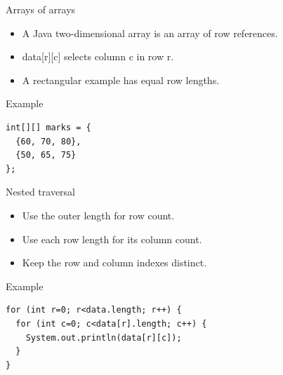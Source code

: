 \documentclass[10pt,aspectratio=169]{beamer}
\begin{document}
\begin{frame}[fragile,t]{Arrays of arrays}
\begin{itemize}
\item A Java two-dimensional array is an array of row references.
\item data[r][c] selects column c in row r.
\item A rectangular example has equal row lengths.
\end{itemize}
\vspace{1mm}\begin{block}{Example}
\begin{lstlisting}
int[][] marks = {
  {60, 70, 80},
  {50, 65, 75}
};
\end{lstlisting}
\end{block}
\end{frame}

\begin{frame}[fragile,t]{Nested traversal}
\begin{itemize}
\item Use the outer length for row count.
\item Use each row length for its column count.
\item Keep the row and column indexes distinct.
\end{itemize}
\vspace{1mm}\begin{block}{Example}
\begin{lstlisting}
for (int r=0; r<data.length; r++) {
  for (int c=0; c<data[r].length; c++) {
    System.out.println(data[r][c]);
  }
}
\end{lstlisting}
\end{block}
\end{frame}
\end{document}
